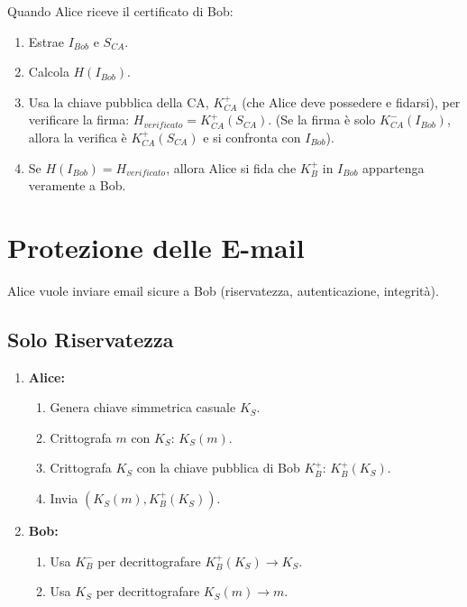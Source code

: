 Quando Alice riceve il certificato di Bob:
\begin{enumerate}
    \item Estrae $I_{Bob}$ e $S_{CA}$.
    \item Calcola $H(I_{Bob})$.
    \item Usa la chiave pubblica della CA, $K_{CA}^+$ (che Alice deve possedere e fidarsi), per verificare la firma: $H_{verificato} = K_{CA}^+(S_{CA})$. (Se la firma è solo $K_{CA}^-(I_{Bob})$, allora la verifica è $K_{CA}^+(S_{CA})$ e si confronta con $I_{Bob}$).
    \item Se $H(I_{Bob}) = H_{verificato}$, allora Alice si fida che $K_B^+$ in $I_{Bob}$ appartenga veramente a Bob.
\end{enumerate}

\section{Protezione delle E-mail}
\label{sec:protezione_email}

Alice vuole inviare email sicure a Bob (riservatezza, autenticazione, integrità).

\subsection{Solo Riservatezza}
\begin{enumerate}
    \item \textbf{Alice:}
    \begin{enumerate}
        \item Genera chiave simmetrica casuale $K_S$.
        \item Crittografa $m$ con $K_S$: $K_S(m)$.
        \item Crittografa $K_S$ con la chiave pubblica di Bob $K_B^+$: $K_B^+(K_S)$.
        \item Invia $(K_S(m), K_B^+(K_S))$.
    \end{enumerate}
    \item \textbf{Bob:}
    \begin{enumerate}
        \item Usa $K_B^-$ per decrittografare $K_B^+(K_S) \rightarrow K_S$.
        \item Usa $K_S$ per decrittografare $K_S(m) \rightarrow m$.
    \end{enumerate}
\end{enumerate}

